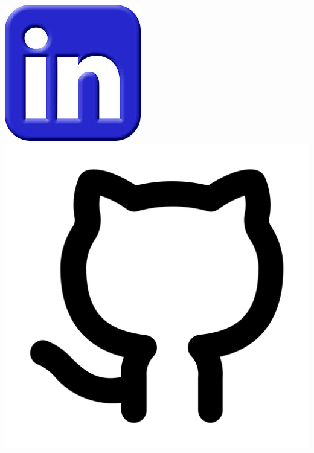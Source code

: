 \documentclass[]{mdkrause_cv_openfont}
\begin{document}
\begin{minipage}[t]{1\textwidth}
\hspace{6 cm} \href{https://www.linkedin.com/in/matheus-dalsente-krause-3012b158/}{\includegraphics[scale=0.125]{./logos/lin.jpeg}} \hspace{2 cm}  \href{https://mdkrause.github.io//}{\includegraphics[scale=0.06]{./logos/github.png}}\hspace{2 cm}

\end{minipage}
\end{document}
